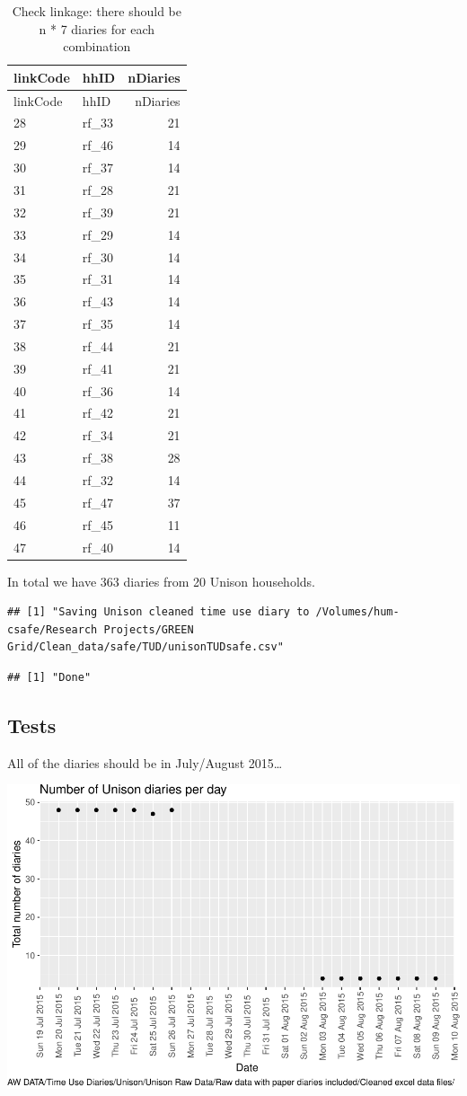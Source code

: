 \documentclass[]{article}
\begin{document}
\begin{longtable}[]{@{}llr@{}}
\caption{Check linkage: there should be n * 7 diaries for each
combination}\tabularnewline
\toprule
linkCode & hhID & nDiaries\tabularnewline
\midrule
\endfirsthead
\toprule
linkCode & hhID & nDiaries\tabularnewline
\midrule
\endhead
28 & rf\_33 & 21\tabularnewline
29 & rf\_46 & 14\tabularnewline
30 & rf\_37 & 14\tabularnewline
31 & rf\_28 & 21\tabularnewline
32 & rf\_39 & 21\tabularnewline
33 & rf\_29 & 14\tabularnewline
34 & rf\_30 & 14\tabularnewline
35 & rf\_31 & 14\tabularnewline
36 & rf\_43 & 14\tabularnewline
37 & rf\_35 & 14\tabularnewline
38 & rf\_44 & 21\tabularnewline
39 & rf\_41 & 21\tabularnewline
40 & rf\_36 & 14\tabularnewline
41 & rf\_42 & 21\tabularnewline
42 & rf\_34 & 21\tabularnewline
43 & rf\_38 & 28\tabularnewline
44 & rf\_32 & 14\tabularnewline
45 & rf\_47 & 37\tabularnewline
46 & rf\_45 & 11\tabularnewline
47 & rf\_40 & 14\tabularnewline
\bottomrule
\end{longtable}

In total we have 363 diaries from 20 Unison households.

\begin{verbatim}
## [1] "Saving Unison cleaned time use diary to /Volumes/hum-csafe/Research Projects/GREEN Grid/Clean_data/safe/TUD/unisonTUDsafe.csv"
\end{verbatim}

\begin{verbatim}
## [1] "Done"
\end{verbatim}

\subsection{Tests}\label{tests-1}

All of the diaries should be in July/August 2015\ldots{}

\includegraphics{processNZGGTUDData_files/figure-latex/unisonDiaryPLot-1.pdf}
\end{document}
